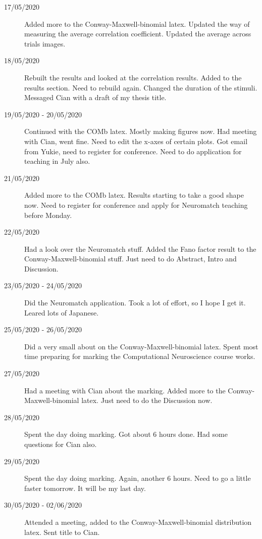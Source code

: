 \documentclass[a4paper,12pt]{article}
\theoremstyle{definition}
\begin{document}
\begin{description}
	\item[17/05/2020] Added more to the Conway-Maxwell-binomial latex. Updated the way of measuring the average correlation coefficient. Updated the average across trials images.

	\item[18/05/2020] Rebuilt the results and looked at the correlation results. Added to the results section. Need to rebuild again. Changed the duration of the stimuli. Messaged Cian with a draft of my thesis title.

	\item[19/05/2020 - 20/05/2020] Continued with the COMb latex. Mostly making figures now. Had meeting with Cian, went fine. Need to edit the x-axes of certain plots. Got email from Yukie, need to register for conference. Need to do application for teaching in July also.

	\item[21/05/2020] Added more to the COMb latex. Results starting to take a good shape now. Need to register for conference and apply for Neuromatch teaching before Monday.

	\item[22/05/2020] Had a look over the Neuromatch stuff. Added the Fano factor result to the Conway-Maxwell-binomial stuff. Just need to do Abstract, Intro and Discussion.

	\item[23/05/2020 - 24/05/2020] Did the Neuromatch application. Took a lot of effort, so I hope I get it. Leared lots of Japanese.

	\item[25/05/2020 - 26/05/2020] Did a very small about on the Conway-Maxwell-binomial latex. Spent most time preparing for marking the Computational Neuroscience course works.

	\item[27/05/2020] Had a meeting with Cian about the marking. Added more to the Conway-Maxwell-binomial latex. Just need to do the Discussion now.

	\item[28/05/2020] Spent the day doing marking. Got about 6 hours done. Had some questions for Cian also.

	\item[29/05/2020] Spent the day doing marking. Again, another 6 hours. Need to go a little faster tomorrow. It will be my last day.

	\item[30/05/2020 - 02/06/2020] Attended a meeting, added to the Conway-Maxwell-binomial distribution latex. Sent title to Cian.


\end{description}
\end{document}
